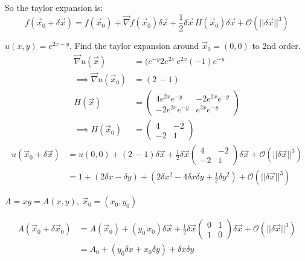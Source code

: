 \documentclass[twoside]{scrartcl}
\begin{document}
So the taylor expansion is:
\begin{equation}\boxed{f(\vec{x}_0 + \delta \vec{x}) = f(\vec{x}_0) + \vec{\nabla}f(\vec{x}_0)\delta \vec{x} + \frac{1}{2}\delta\vec{x}\,H(\vec{x}_0)\delta\vec{x} + \mathcal{O}(||\delta\vec{x}||^3)}\end{equation}
\pagebreak
\begin{example}
$u(x,y) = e^{2x-y}$. Find the taylor expansion around $\vec{x}_0 = (0,0)$ to 2nd order. 
\[
\begin{aligned}
  \vec{\nabla}u(\vec{x}) &= (e^{-y}2e^{2x}\, e^{2x}(-1)e^{-y}\\
  \implies \vec{\nabla}u(\vec{x}_0) &= (2\,-1)\\[0.1cm]
  H(\vec{x}) &= \begin{pmatrix}
 4e^{2x}e^{-y} & -2e^{2x}e^{-y}\\
 -2e^{2x}e^{-y} & e^{2x}e^{-y}	
 \end{pmatrix}\\
 \implies H(\vec{x}_0) &= \begin{pmatrix}
 	4 & -2 \\ -2 & 1
 \end{pmatrix}
\end{aligned}
\]
\[
\begin{aligned}
  u(\vec{x}_0 + \delta \vec{x}) &= u(0,0) + (2 \, -1)\delta \vec{x} + \frac{1}{2}\delta \vec{x} \begin{pmatrix}
  4 & -2\\ -2 & 1
  \end{pmatrix}\delta \vec{x} + \mathcal{O}(||\delta\vec{x}||^3)\\
  &= 1 + (2\delta x -\delta y) + (2\delta x^2 -4\delta x \delta y + \frac{1}{2}\delta y^2) + \mathcal{O}(||\delta\vec{x}||^3)
\end{aligned}
\]
\end{example}

\begin{example}
$A = xy = A(x,y),~ \vec{x}_0 = (x_0, y_0)$

\[
\begin{aligned}
  A(\vec{x}_0+ \delta \vec{x}_0) &= A(\vec{x}_0) + (y_0\, x_0)\delta \vec{x} + \frac{1}{2}\delta\vec{x}\begin{pmatrix}
0 & 1\\ 1 & 0	
\end{pmatrix}\delta\vec{x} + \mathcal{O}(||\delta\vec{x}||^3)\\
&= A_0 + (y_0\delta x + x_0\delta y) + \delta x \delta y
\end{aligned}
\]
\end{example}~
\end{document}
